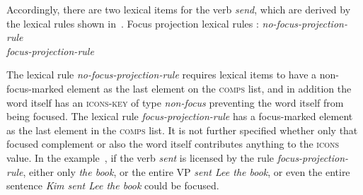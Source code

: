 \documentclass[output=paper,biblatex,babelshorthands,newtxmath,draftmode,colorlinks,citecolor=brown]{langscibook}
\begin{document}
Accordingly, there are two lexical items for the verb \textit{send},
which are derived by the lexical rules shown
in~.
\ea
\label{ex:song-focus-projection}
Focus projection lexical rules \citep[227]{song2018}:
\ea
\emph{no-focus-projection-rule} \impl \\
\ex
\emph{focus-projection-rule} \impl \\
\z
\z

The lexical rule \textit{no-focus-projection-rule} requires lexical
items to have a non-focus-marked element as the last element on the
\textsc{comps} list, and in addition the word itself has an
\textsc{icons-key} of type \textit{non-focus} preventing the word
itself from being focused. The lexical rule \textit{focus-projection-rule}
has a focus-marked element as the last element in the \textsc{comps}
list. It is not further specified whether only that focused
complement or also the word itself contributes anything to the
\textsc{icons} value. In the example~,
if the verb \textit{sent} is licensed by the rule
\textit{focus-projection-rule}, either only \textit{the book},
or the entire VP \textit{sent Lee the book}, or even the
entire sentence \textit{Kim sent Lee the book} could be focused.
\end{document}

